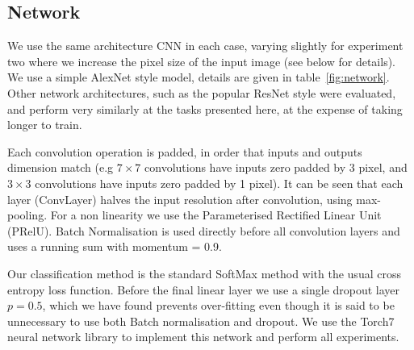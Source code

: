 \subsection {Network}

We use the same architecture CNN in each case, varying slightly for experiment two where we increase the pixel size of the input image (see below for details). We use a simple AlexNet \cite {Krizhevsky2012} style model, details are given in table~\ref{fig:network}. Other network architectures, such as the popular ResNet \cite{He2015} style were evaluated, and perform very similarly at the tasks presented here, at the expense of taking longer to train.

Each convolution operation is padded, in order that inputs and outputs dimension match (e.g $ 7\times7 $ convolutions have inputs zero padded by 3 pixel, and $3\times3$ convolutions have inputs zero padded by 1 pixel). It can be seen that each layer (ConvLayer) halves the input resolution after convolution, using max-pooling. For a non linearity we use the Parameterised Rectified Linear Unit (PRelU). Batch Normalisation is used directly before all convolution layers and uses a running sum with momentum = 0.9.

Our classification method is the standard SoftMax method with the usual cross entropy loss function. Before the final linear layer we use a single dropout layer $ p = 0.5 $, which we have found prevents over-fitting even though it is said to be unnecessary to use both Batch normalisation and dropout.  We use the Torch7 \cite{Collobert2011} neural network library to implement this network and perform all experiments. 

